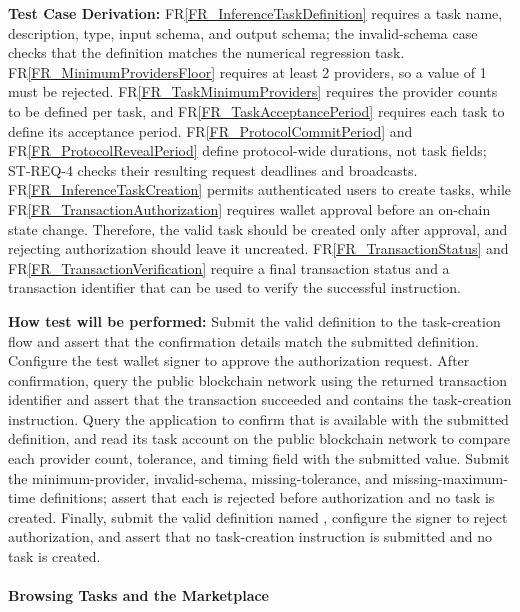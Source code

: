 \documentclass[12pt]{article}
\newcommand{\rref}[1]{FR\ref{#1}}
\newcommand{\fixture}[1]{\texttt{\seqsplit{#1}}}
\begin{document}
\begin{enumerate}
\textbf{Test Case Derivation:} \rref{FR_InferenceTaskDefinition} requires a task name,
description, type, input schema, and output schema; the invalid-schema case
checks that the definition matches the numerical regression task.
\rref{FR_MinimumProvidersFloor} requires at least 2 providers, so a value of 1
must be rejected. \rref{FR_TaskMinimumProviders} requires the provider counts to be defined per
task, and \rref{FR_TaskAcceptancePeriod} requires each task to define its
acceptance period. \rref{FR_ProtocolCommitPeriod} and
\rref{FR_ProtocolRevealPeriod} define protocol-wide durations, not task fields;
ST-REQ-4 checks their resulting request deadlines and broadcasts.
\rref{FR_InferenceTaskCreation} permits authenticated users
to create tasks, while \rref{FR_TransactionAuthorization} requires wallet
approval before an on-chain state change. Therefore, the valid task should be
created only after approval, and rejecting authorization should leave it
uncreated. \rref{FR_TransactionStatus} and \rref{FR_TransactionVerification}
require a final transaction status and a transaction identifier that can be
used to verify the successful instruction.

\textbf{How test will be performed:} Submit the valid
definition to the task-creation flow and assert that the confirmation details
match the submitted definition. Configure the test wallet signer to approve
the authorization request. After confirmation, query the public blockchain network using the
returned transaction identifier and assert that the transaction succeeded and
contains the task-creation instruction. Query the application to confirm that
\fixture{Regression-Test-Task} is available with the submitted definition, and
read its task account on the public blockchain network to compare each provider count,
tolerance, and timing field with the submitted value. Submit the
minimum-provider, invalid-schema, missing-tolerance, and missing-maximum-time
definitions; assert that each is rejected before authorization and no task is created. Finally, submit the
valid definition named \fixture{Rejected-Authorization-Task}, configure the
signer to reject authorization, and assert that no task-creation instruction
is submitted and no task is created.

\end{enumerate}

\paragraph{Browsing Tasks and the Marketplace}
\end{document}

